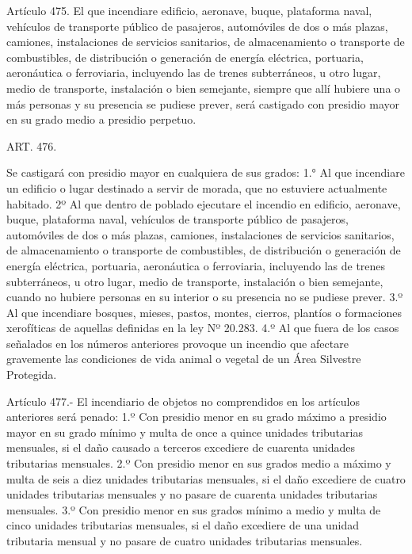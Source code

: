     Artículo 475. El que incendiare edificio, aeronave, buque, plataforma naval, vehículos de transporte público de pasajeros, automóviles de dos o más plazas, camiones, instalaciones de servicios sanitarios, de almacenamiento o transporte de combustibles, de distribución o generación de energía eléctrica, portuaria, aeronáutica o ferroviaria, incluyendo las de trenes subterráneos, u otro lugar, medio de transporte, instalación o bien semejante, siempre que allí hubiere una o más personas y su presencia se pudiese prever, será castigado con presidio mayor en su grado medio a presidio perpetuo.



    ART. 476.

    Se castigará con presidio mayor en cualquiera de sus grados:
    1.° Al que incendiare un edificio o lugar destinado a servir de morada, que no estuviere actualmente habitado.
    2º Al que dentro de poblado ejecutare el incendio en edificio, aeronave, buque, plataforma naval, vehículos de transporte público de pasajeros, automóviles de dos o más plazas, camiones, instalaciones de servicios sanitarios, de almacenamiento o transporte de combustibles, de distribución o generación de energía eléctrica, portuaria, aeronáutica o ferroviaria, incluyendo las de trenes subterráneos, u otro lugar, medio de transporte, instalación o bien semejante, cuando no hubiere personas en su interior o su presencia no se pudiese prever.
    3.º Al que incendiare bosques, mieses, pastos, montes, cierros, plantíos o formaciones xerofíticas de aquellas definidas en la ley Nº 20.283.
    4.º Al que fuera de los casos señalados en los números anteriores provoque un incendio que afectare gravemente las condiciones de vida animal o vegetal de un Área Silvestre Protegida.



    Artículo 477.- El incendiario de objetos no comprendidos en los artículos anteriores será penado:
    1.º Con presidio menor en su grado máximo a presidio mayor en su grado mínimo y multa de once a quince unidades tributarias mensuales, si el daño causado a terceros excediere de cuarenta unidades tributarias mensuales.
    2.º Con presidio menor en sus grados medio a máximo y multa de seis a diez unidades tributarias mensuales, si el daño excediere de cuatro unidades tributarias mensuales y no pasare de cuarenta unidades tributarias mensuales.
    3.º Con presidio menor en sus grados mínimo a medio y multa de cinco unidades tributarias mensuales, si el daño excediere de una unidad tributaria mensual y no pasare de cuatro unidades tributarias mensuales.



